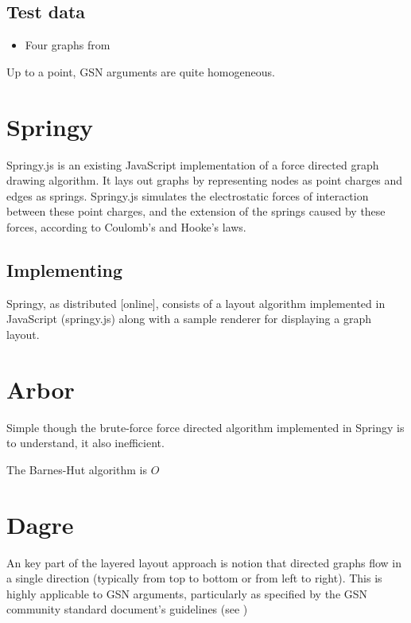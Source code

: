 \subsection{Test data}

\begin{itemize}
    \item Four graphs from \citet{aldenthesis}
\end{itemize}

Up to a point, GSN arguments are quite homogeneous. 


\section{Springy}

Springy.js is an existing JavaScript implementation of a force directed graph drawing algorithm.
It lays out graphs by representing nodes as point charges and edges as springs. Springy.js simulates the electrostatic forces of interaction between these point charges, and the extension of the springs caused by these forces, according to Coulomb's and Hooke's laws.


\subsection{Implementing }

Springy, as distributed [online], consists of a layout algorithm implemented in JavaScript (springy.js) along with a sample renderer for displaying a graph layout.

\section{Arbor}

Simple though the brute-force force directed algorithm implemented in Springy is to understand, it also inefficient.

The Barnes-Hut algorithm is $O$



\section{Dagre}

An key part of the layered layout approach is notion that directed graphs flow in a single direction (typically from top to bottom or from left to right). This is highly applicable to GSN arguments, particularly as specified by the GSN community standard document's guidelines \cite{gsnspec} (see )

